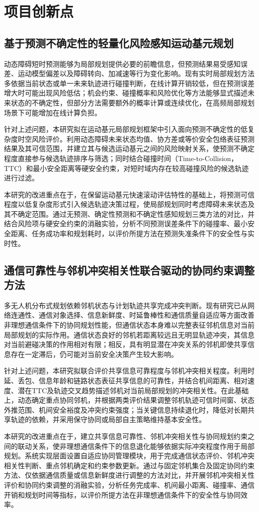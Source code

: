 \chapter{项目创新点}

\section{基于预测不确定性的轻量化风险感知运动基元规划}

动态障碍短时预测能够为局部规划提供必要的前瞻信息，但预测结果易受感知误差、运动模型偏差以及障碍转向、加减速等行为变化影响。现有实时局部规划方法多依据当前状态或单一未来轨迹进行碰撞判断，在线计算开销较低，但在预测误差增大时可能出现风险低估；机会约束、碰撞概率和风险优化等方法能够显式描述未来状态的不确定性，但部分方法需要额外的概率计算或连续优化，在高频局部规划场景下可能增加在线计算负担。

针对上述问题，本研究拟在运动基元局部规划框架中引入面向预测不确定性的低复杂度时空风险评价。利用动态障碍未来状态均值、协方差或等价安全包络表征预测结果及其可信范围，并建立其与候选运动基元之间的风险映射关系，使预测不确定程度直接参与候选轨迹排序与筛选；同时结合碰撞时间（Time-to-Collision，TTC）和最小安全距离等硬安全约束，对短时域内存在较高碰撞风险的候选轨迹进行过滤。

本研究的改进重点在于，在保留运动基元快速滚动评估特性的基础上，将预测可信程度以低复杂度形式引入候选轨迹决策过程，使局部规划同时考虑障碍未来状态及其不确定范围。通过无预测、确定性预测和不确定性感知规划三类方法的对比，并结合风险项与硬安全约束的消融实验，分析不同预测误差条件下的碰撞率、最小安全距离、任务成功率和规划耗时，以评价所提方法在预测失准条件下的安全性与实时性。

\section{通信可靠性与邻机冲突相关性联合驱动的协同约束调整方法}

多无人机分布式规划依赖邻机状态与计划轨迹共享完成冲突判断。现有研究已从网络连通性、通信对象选择、信息新鲜度、时延鲁棒性和通信质量自适应等方面改善非理想通信条件下的协同规划性能，但通信状态本身难以完整表征邻机信息对当前局部规划的实际作用。通信状态良好的邻机若距离较远且无明显轨迹冲突，其信息对当前避碰决策的作用相对有限；相反，具有明显潜在冲突关系的邻机即使共享信息存在一定滞后，仍可能对当前安全决策产生较大影响。

针对上述问题，本研究拟联合评价共享信息可靠程度与邻机冲突相关程度。利用时延、丢包、信息年龄和链路状态表征共享信息的可靠性，并结合机间距离、相对速度、潜在TTC及轨迹交叉趋势描述邻机对当前局部规划的冲突相关性。在此基础上，动态确定重点协同邻机，并根据两类评价结果调整邻机轨迹可信时间窗、状态外推范围、机间安全裕度及冲突约束强度；当关键信息持续退化时，降低对长期共享轨迹的依赖，并采用保守协同或局部自主策略维持基本安全性。

本研究的改进重点在于，建立共享信息可靠性、邻机冲突相关性与协同规划约束之间的联动关系，使非理想通信条件下的信息退化能够依据实际冲突程度作用于局部规划。系统实现层面设置自适应协同管理模块，用于完成通信状态评价、邻机冲突相关性判断、重点邻机确定和约束参数更新。通过与固定邻机集合及固定协同约束方法、仅依据通信质量或信息新鲜度进行调整的方法对比，并开展邻机冲突相关性评价和协同约束调整的消融实验，分析任务完成率、机间最小距离、碰撞率、通信开销和规划时间等指标，以评价所提方法在非理想通信条件下的安全性与协同效率。
